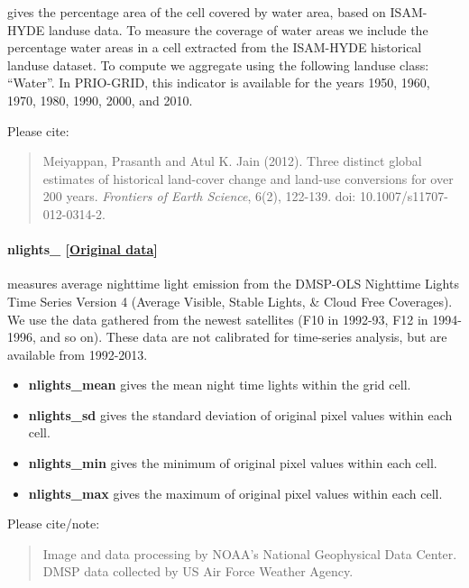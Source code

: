 \documentclass[]{book}
\begin{document}
gives the percentage area of the cell covered by water area, based on
ISAM-HYDE landuse data. To measure the coverage of water areas we
include the percentage water areas in a cell extracted from the
ISAM-HYDE historical landuse dataset. To compute  we
aggregate using the following landuse class: ``Water''. In PRIO-GRID,
this indicator is available for the years 1950, 1960, 1970, 1980, 1990,
2000, and 2010.

Please cite:

\begin{quote}
Meiyappan, Prasanth and Atul K. Jain (2012). Three distinct global
estimates of historical land-cover change and land-use conversions for
over 200 years. \emph{Frontiers of Earth Science}, 6(2), 122-139. doi:
10.1007/s11707-012-0314-2.
\end{quote}

\paragraph{nlights\_
{[}\href{http://ngdc.noaa.gov/eog/dmsp/downloadV4composites.html}{Original
data}{]}}\label{nlights-}

measures average nighttime light emission from the DMSP-OLS Nighttime
Lights Time Series Version 4 (Average Visible, Stable Lights, \& Cloud
Free Coverages). We use the data gathered from the newest satellites
(F10 in 1992-93, F12 in 1994-1996, and so on). These data are not
calibrated for time-series analysis, but are available from 1992-2013.

\begin{itemize}
\itemsep1pt\parskip0pt
\item
  \textbf{nlights\_mean} gives the mean night time lights within the
  grid cell.
\item
  \textbf{nlights\_sd} gives the standard deviation of original pixel
  values within each cell.
\item
  \textbf{nlights\_min} gives the minimum of original pixel values
  within each cell.
\item
  \textbf{nlights\_max} gives the maximum of original pixel values
  within each cell.
\end{itemize}

Please cite/note:

\begin{quote}
Image and data processing by NOAA's National Geophysical Data Center.
DMSP data collected by US Air Force Weather Agency.
\end{quote}
\end{document}
